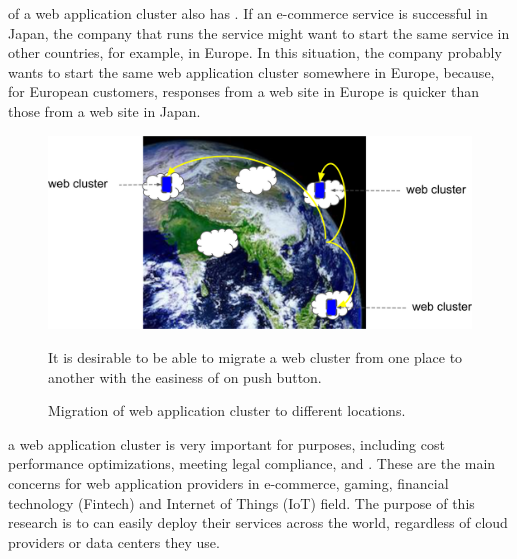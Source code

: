  of a web application cluster also has .
If an e-commerce service is successful in Japan, the company that runs the service might want to start the same service in other countries, for example, in Europe.
In this situation, the company probably wants to start the same web application cluster somewhere in Europe, because, for European customers, responses from a web site in Europe is quicker than those from a web site in Japan.

\begin{figure}[h]
\begin{center}
\includegraphics[width=0.7\columnwidth]{Figs/earth}
\end{center}
\caption{
Migration of web application cluster to different locations.
}
\centering\parbox[c]{0.9\columnwidth}{
It is desirable to be able to migrate a web cluster from one place to another with the easiness of on push button.
}
\label{fig:earth}
\end{figure}

 a web application cluster is  very important for  purposes, including cost performance optimizations, meeting legal compliance, and .
These are the main concerns for web application providers in e-commerce, gaming, financial technology (Fintech) and Internet of Things (IoT) field.
The purpose of this research is to  can easily deploy their services across the world, regardless of cloud providers or data centers they use.

